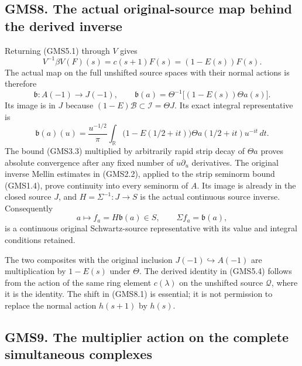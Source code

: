 \subsection{GMS8. The actual original-source map behind the derived
inverse}\label{gms8.-the-actual-original-source-map-behind-the-derived-inverse}

Returning (GMS5.1) through \(V\) gives \[
V^{-1}\beta V(F)(s)=c(s+1)F(s)=(1-E(s))F(s).
\tag{GMS8.1}
\] The actual map on the full unshifted source spaces with their normal
actions is therefore \[
\mathfrak b:A(-1)\longrightarrow J(-1),\qquad
\mathfrak b(a)=\Theta^{-1}\bigl[(1-E(s))\Theta a(s)\bigr].
\tag{GMS8.2}
\] Its image is in \(J\) because
\((1-E)\mathcal B\subset\mathcal I=\Theta J\). Its exact integral
representative is \[
\mathfrak b(a)(u)=\frac{u^{-1/2}}\pi
\int_{\mathbb R}
\bigl(1-E(1/2+it)\bigr)\Theta a(1/2+it)u^{-it}\,dt.
\tag{GMS8.3}
\] The bound (GMS3.3) multiplied by arbitrarily rapid strip decay of
\(\Theta a\) proves absolute convergence after any fixed number of
\(u\partial_u\) derivatives. The original inverse Mellin estimates in
(GMS2.2), applied to the strip seminorm bound (GMS1.4), prove continuity
into every seminorm of \(A\). Its image is already in the closed source
\(J\), and \(H=\Sigma^{-1}:J\to S\) is the actual continuous source
inverse. Consequently \[
a\longmapsto f_a=H\mathfrak b(a)\in S,
\qquad\Sigma f_a=\mathfrak b(a),
\tag{GMS8.4}
\] is a continuous original Schwartz-source representative with its
value and integral conditions retained.

The two composites with the original inclusion
\(J(-1)\hookrightarrow A(-1)\) are multiplication by \(1-E(s)\) under
\(\Theta\). The derived identity in (GMS5.4) follows from the action of
the same ring element \(c(\lambda)\) on the unshifted source
\(\mathcal Q\), where it is the identity. The shift in (GMS8.1) is
essential; it is not permission to replace the normal action \(h(s+1)\)
by \(h(s)\).

\subsection{GMS9. The multiplier action on the complete simultaneous
complexes}\label{gms9.-the-multiplier-action-on-the-complete-simultaneous-complexes}

